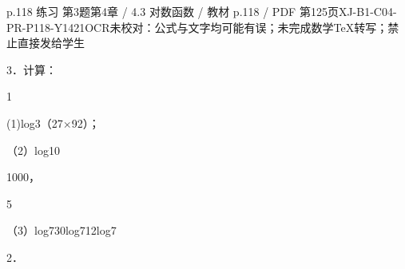 \begin{bankitem}{p.118 练习 第3题}{第4章 / 4.3 对数函数 / 教材 p.118 / PDF 第125页}{XJ-B1-C04-PR-P118-Y1421}{OCR未校对：公式与文字均可能有误；未完成数学TeX转写；禁止直接发给学生}
\begin{ocrdraft}
\par
3．计算：
\par
1
\par
(1)log3（27\ensuremath{\times}92）；
\par
（2）log10
\par
1000，
\par
5
\par
（3）log730log712log7
\par
2．
\end{ocrdraft}
\end{bankitem}
